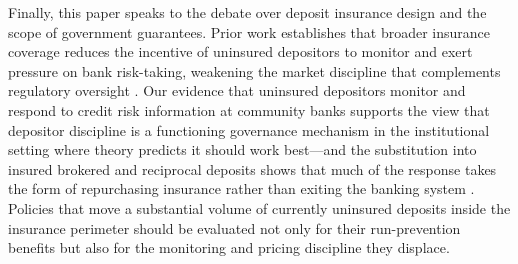 Finally, this paper speaks to the debate over deposit insurance design and the
scope of government guarantees.  Prior work establishes that broader insurance
coverage reduces the incentive of uninsured depositors to monitor and exert
pressure on bank risk-taking, weakening the market discipline that complements
regulatory oversight \citep{demirgucc2004market, flannery2019market}.  Our
evidence that uninsured depositors monitor and respond to credit risk
information at community banks supports the view that depositor discipline is a
functioning governance mechanism in the institutional setting where theory
predicts it should work best---and the substitution into insured brokered and
reciprocal deposits shows that much of the response takes the form of
repurchasing insurance rather than exiting the banking system
\citep{kim2024insurance}.  Policies that move a substantial volume of currently
uninsured deposits inside the insurance perimeter should be evaluated not only
for their run-prevention benefits but also for the monitoring and pricing
discipline they displace.
